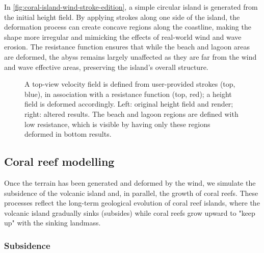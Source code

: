 In \cref{fig:coral-island-wind-stroke-edition}, a simple circular island is generated from the initial height field. By applying strokes along one side of the island, the deformation process can create concave regions along the coastline, making the shape more irregular and mimicking the effects of real-world wind and wave erosion. The resistance function ensures that while the beach and lagoon areas are deformed, the abyss remains largely unaffected as they are far from the wind and wave effective areas, preserving the island's overall structure.

\begin{figure}
    \caption{A top-view velocity field is defined from user-provided strokes (top, blue), in association with a resistance function (top, red); a height field is deformed accordingly. Left: original height field and render; right: altered results. The beach and lagoon regions are defined with low resistance, which is visible by having only these regions deformed in bottom results.}
    \label{fig:coral-island-wind-effect-result}
\end{figure}

\subsection{Coral reef modelling}
\label{sec:coral-island-coral-reef}

Once the terrain has been generated and deformed by the wind, we simulate the subsidence of the volcanic island and, in parallel, the growth of coral reefs. These processes reflect the long-term geological evolution of coral reef islands, where the volcanic island gradually sinks (subsides) while coral reefs grow upward to "keep up" with the sinking landmass.

\subsubsection{Subsidence}
\label{sec:coral-island-subsidence}

